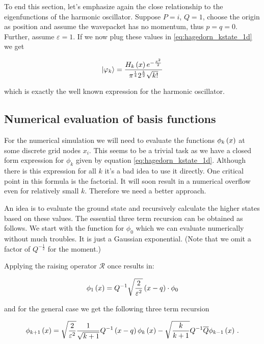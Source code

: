 To end this section, let's emphasize again the close relationship to the eigenfunctions
of the harmonic oscillator. Suppose $P=i$, $Q=1$, choose the origin as position and assume
the wavepacket has no momentum, thus $p=q=0$. Further, assume $\varepsilon = 1$.
If we now plug these values in \eqref{eq:hagedorn_kstate_1d} we get

\begin{equation}
  \Ket{\varphi_k} = \frac{H_k\left( x \right) e^{-\frac{x^2}{2}}}{\pi^{\frac{1}{4}}2^{\frac{k}{2}}\sqrt{k!}}
\end{equation}

which is exactly the well known expression for the harmonic oscillator.

\subsection{Numerical evaluation of basis functions}

For the numerical simulation we will need to evaluate the functions $\phi_k\left( x \right)$
at some discrete grid nodes $x_i$. This seems to be a trivial task as we have a
closed form expression for $\phi_k$ given by equation \eqref{eq:hagedorn_kstate_1d}.
Although there is this expression for all $k$ it's a bad idea to use it directly.
One critical point in this formula is the factorial. It will soon result in a
numerical overflow even for relatively small $k$. Therefore we need a better approach.

An idea is to evaluate the ground state and recursively calculate the higher states
based on these values. The essential three term recursion can be obtained as follows.
We start with the function for $\phi_0$ which we can evaluate numerically without
much troubles. It is just a Gaussian exponential. (Note that we omit a factor of
$Q^{-\frac{1}{2}}$ for the moment.)

Applying the raising operator $\mathcal{R}$ once results in:

\begin{equation}
  \phi_1\left( x \right) = Q^{-1} \sqrt{\frac{2}{\varepsilon^2}}\left(x-q\right) \cdot \phi_0
\end{equation}

and for the general case we get the following three term recursion

\begin{equation} \label{eq:hagedorn_recursion_rel}
  \phi_{k+1}\left( x \right) = \sqrt{\frac{2}{\varepsilon^2}} \frac{1}{\sqrt{k+1}} Q^{-1}
                      \left(x-q\right) \phi_k\left( x \right)
                      - \sqrt{\frac{k}{k+1}} Q^{-1} \overline{Q} \phi_{k-1} \left( x \right) \,.
\end{equation}

